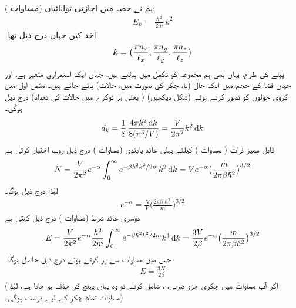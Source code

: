 ہم نے حصہ  میں اجازتی توانائیاں (مساوات ):
\begin{align}
E_k = \frac{\hslash^2}{2 m} k^2
\end{align}
اخذ کیں جہاں درج ذیل تھا۔
\begin{align*}
{\ensuremath{{\boldsymbol{k}}}} = \big ( \frac{\pi n_x}{\ell_x} , \frac{\pi n_y}{\ell_y} , \frac{\pi n_z}{\ell_z} \big )
\end{align*}
پہلے کی طرح، یہاں بھی ہم مجموعہ کو تکمل میں بدلتے ہیں، جہاں  ایک استمراری متغیر ہے، اور جہاں  فضا کے  حجم میں ایک حال (یا، چکر  کی صورت میں،  حالات) پائے جاتے ہیں۔ مثمن اول میں کروی خولوں کو  تصور کرتے ہوئے (شکل  دیکھیں)  ( یعنی ہر ٹوکرے میں حالات کی تعداد) درج ذیل ہوگی۔
\begin{align}\label{مساوات_متماثل_انحطاط_خول_کی}
d_k = \frac{1}{8}\, \frac{4 \pi k^2 \dif k}{8 (\pi^3 /V)} = \frac{V}{2 \pi^2} k^2 \dif k
\end{align}
قابل ممیز ذرات ( مساوات ) کیلئے پہلی عائد پابندی (مساوات ) درج ذیل روپ اختیار کرتی ہے 
\begin{align*}
N = \frac{V}{2 \pi^2} e^{- \alpha} \int_0^{\infty} e^{- \beta \hslash^2 k^2 / 2m} k^2 \dif k = V e^{- \alpha} \big ( \frac{m}{2 \pi \beta \hslash^2} \big )^{3/2}
\end{align*}
لہٰذا درج ذیل ہوگا۔
\begin{align}\label{مساوات_متماثل_درمیانہ_نتیجہ}
e^{- \alpha} = \frac{N}{V} \big ( \frac{2 \pi \beta \hslash^2}{m} \big )^{3/2}
\end{align}
دوسری عائد شرط (مساوات ) درج ذیل کہتی ہے 
\begin{align*}
E = \frac{V}{2 \pi^2} e^{- \alpha} \frac{\hslash^2}{2 m} \int_0^\infty e^{- \beta \hslash^2 k^2 /2m} k^4 \dif k = \frac{3 V}{2 \beta} e^{- \alpha} \big ( \frac{m}{2 \pi \beta \hslash^2} \big )^{3/2}
\end{align*}
جس میں مساوات  سے  پر کرتے ہوئے درج ذیل حاصل ہوگا۔
\begin{align}\label{مساوات_متماثل_درست_ہر_صورت}
E = \frac{3 N}{2 \beta}
\end{align}
(اگر آپ مساوات  میں چکری جزو ضربی، ، شامل کرتے تو وہ یہاں پہنچ کر حذف ہو جاتا ہے، لہٰذا مساوات  تمام چکر کے لیے درست ہوگی۔) 

